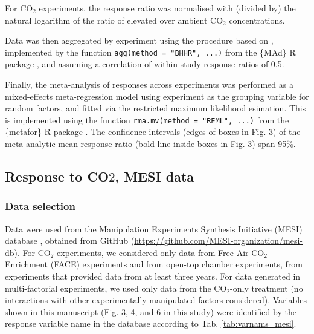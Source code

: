 \documentclass{myreport}
\begin{document}
For CO$_2$ experiments, the response ratio was normalised with (divided by) the natural logarithm of the ratio of elevated over ambient CO$_2$ concentrations.

Data was then aggregated by experiment using the procedure based on \citet{borenstein_effect_2009}, implemented by the function \texttt{agg(method = "BHHR", ...)} from the \{MAd\} R package \citep{mad_r_package}, and assuming a correlation of within-study response ratios of 0.5.

Finally, the meta-analysis of responses across experiments was performed as a mixed-effects meta-regression model using experiment as the grouping variable for random factors, and fitted via the restricted maximum likelihood esimation. This is implemented using the function \texttt{rma.mv(method = "REML", ...)} from the \{metafor\} R package \citep{viechtbauer_conducting_2010}. The confidence intervals (edges of boxes in Fig. 3) of the meta-analytic mean response ratio (bold line inside boxes in Fig. 3) span 95\%. 


\subsection{Response to CO$2$, MESI data}

\subsubsection{Data selection}

Data were used from the Manipulation Experiments Synthesis Initiative (MESI) database \citep{vansundert_when_2023}, obtained from GitHub (\url{https://github.com/MESI-organization/mesi-db}). For CO$_2$ experiments, we considered only data from Free Air CO$_2$ Enrichment (FACE) experiments and from open-top chamber experiments, from experiments that provided data from at least three years. For data generated in multi-factorial experiments, we used only data from the CO$_2$-only treatment (no interactions with other experimentally manipulated factors considered). Variables shown in this manuscript (Fig. 3, 4, and 6 in this study) were identified by the response variable name in the database according to Tab. \ref{tab:varnams_mesi}.
\end{document}
